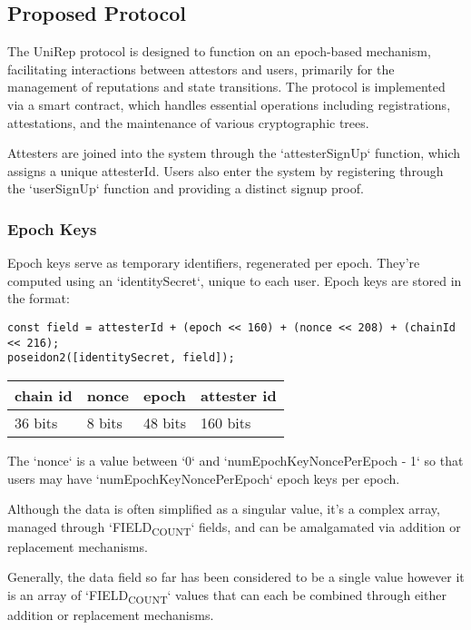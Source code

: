 \documentclass[11pt]{article}
\begin{document}
\subsection{Proposed Protocol}
\label{sec:org25baa3b}

The UniRep protocol is designed to function on an epoch-based mechanism, facilitating interactions between attestors and users, primarily for the management of reputations and state transitions. The protocol is implemented via a smart contract, which handles essential operations including registrations, attestations, and the maintenance of various cryptographic trees.

Attesters are joined into the system through the `attesterSignUp` function, which assigns a unique attesterId. Users also enter the system by registering through the `userSignUp` function and providing a distinct signup proof.
\subsubsection{Epoch Keys}
\label{sec:orgb19d194}

Epoch keys serve as temporary identifiers, regenerated per epoch. They're computed using an `identitySecret`, unique to each user. Epoch keys are stored in the format:

\begin{verbatim}
const field = attesterId + (epoch << 160) + (nonce << 208) + (chainId << 216);
poseidon2([identitySecret, field]);
\end{verbatim}

\begin{center}
\begin{tabular}{llll}
chain id & nonce & epoch & attester id\\[0pt]
\hline
36 bits & 8 bits & 48 bits & 160 bits\\[0pt]
\end{tabular}
\end{center}

The `nonce` is a value between `0` and `numEpochKeyNoncePerEpoch - 1` so that users may have `numEpochKeyNoncePerEpoch` epoch keys per epoch.

Although the data is often simplified as a singular value, it's a complex array, managed through `FIELD\textsubscript{COUNT}` fields, and can be amalgamated via addition or replacement mechanisms.

Generally, the data field so far has been considered to be a single value however it is an array of `FIELD\textsubscript{COUNT}` values that can each be combined through either addition or replacement mechanisms.
\end{document}
